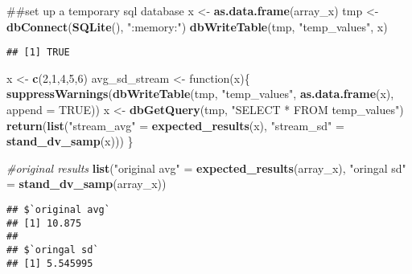 \documentclass[]{article}
\newenvironment{Shaded}{\begin{snugshade}}{\end{snugshade}}
\newcommand{\KeywordTok}[1]{\textcolor[rgb]{0.13,0.29,0.53}{\textbf{{#1}}}}
\newcommand{\DataTypeTok}[1]{\textcolor[rgb]{0.13,0.29,0.53}{{#1}}}
\newcommand{\DecValTok}[1]{\textcolor[rgb]{0.00,0.00,0.81}{{#1}}}
\newcommand{\StringTok}[1]{\textcolor[rgb]{0.31,0.60,0.02}{{#1}}}
\newcommand{\CommentTok}[1]{\textcolor[rgb]{0.56,0.35,0.01}{\textit{{#1}}}}
\newcommand{\OtherTok}[1]{\textcolor[rgb]{0.56,0.35,0.01}{{#1}}}
\newcommand{\NormalTok}[1]{{#1}}
\begin{document}
\begin{Shaded}
\begin{Highlighting}[]
\NormalTok{##set up a temporary sql database}
\NormalTok{x <-}\StringTok{ }\KeywordTok{as.data.frame}\NormalTok{(array_x)}
\NormalTok{tmp <-}\StringTok{ }\KeywordTok{dbConnect}\NormalTok{(}\KeywordTok{SQLite}\NormalTok{(), }\StringTok{":memory:"}\NormalTok{)}
\KeywordTok{dbWriteTable}\NormalTok{(tmp, }\StringTok{"temp_values"}\NormalTok{, x)}
\end{Highlighting}
\end{Shaded}

\begin{verbatim}
## [1] TRUE
\end{verbatim}

\begin{Shaded}
\begin{Highlighting}[]
\NormalTok{x <-}\StringTok{ }\KeywordTok{c}\NormalTok{(}\DecValTok{2}\NormalTok{,}\DecValTok{1}\NormalTok{,}\DecValTok{4}\NormalTok{,}\DecValTok{5}\NormalTok{,}\DecValTok{6}\NormalTok{)}
\NormalTok{avg_sd_stream <-}\StringTok{ }\NormalTok{function(x)\{}
                  \KeywordTok{suppressWarnings}\NormalTok{(}\KeywordTok{dbWriteTable}\NormalTok{(tmp, }\StringTok{"temp_values"}\NormalTok{, }\KeywordTok{as.data.frame}\NormalTok{(x), }\DataTypeTok{append =} \OtherTok{TRUE}\NormalTok{))}
                  \NormalTok{x <-}\StringTok{ }\KeywordTok{dbGetQuery}\NormalTok{(tmp, }\StringTok{"SELECT * FROM temp_values"}\NormalTok{)}
                  \KeywordTok{return}\NormalTok{(}\KeywordTok{list}\NormalTok{(}\StringTok{"stream_avg"} \NormalTok{=}\StringTok{ }\KeywordTok{expected_results}\NormalTok{(x), }\StringTok{"stream_sd"} \NormalTok{=}\StringTok{ }\KeywordTok{stand_dv_samp}\NormalTok{(x)))}
\NormalTok{\}}
\end{Highlighting}
\end{Shaded}

\begin{Shaded}
\begin{Highlighting}[]
\CommentTok{#original results }
\KeywordTok{list}\NormalTok{(}\StringTok{"original avg"} \NormalTok{=}\StringTok{ }\KeywordTok{expected_results}\NormalTok{(array_x), }\StringTok{"oringal sd"} \NormalTok{=}\StringTok{ }\KeywordTok{stand_dv_samp}\NormalTok{(array_x))}
\end{Highlighting}
\end{Shaded}

\begin{verbatim}
## $`original avg`
## [1] 10.875
## 
## $`oringal sd`
## [1] 5.545995
\end{verbatim}
\end{document}
